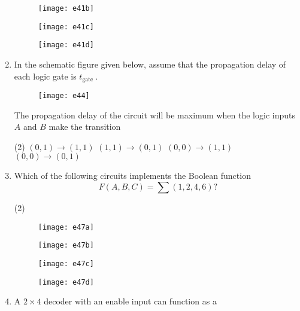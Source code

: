 \begin{enumerate}
\begin{tasks}
\begin{figure}[H]
			\centering
			\texttt{[image: e41b]}
		\end{figure}
		\task[\textbf{C.}] \begin{figure}[H]
			\centering
			\texttt{[image: e41c]}
		\end{figure}
		\task[\textbf{D.}] \begin{figure}[H]
			\centering
			\texttt{[image: e41d]}
		\end{figure}
	\end{tasks}
	\item In the schematic figure given below, assume that the propagation delay of each logic gate is $t_{\text {gate }}$.\\
	\begin{figure}[H]
		\centering
		\texttt{[image: e44]}
	\end{figure}
	The propagation delay of the circuit will be maximum when the logic inputs $A$ and $B$ make the transition
	{}
	\begin{tasks}(2)
		\task[\textbf{A.}] $(0,1) \rightarrow(1,1)$
		\task[\textbf{B.}] $(1,1) \rightarrow(0,1)$
		\task[\textbf{C.}] $(0,0) \rightarrow(1,1)$
		\task[\textbf{D.}] 	$(0,0) \rightarrow(0,1)$
	\end{tasks}
	\item Which of the following circuits implements the Boolean function
	$$F(A, B, C)=\sum(1,2,4,6) ?$$
	{	}
	\begin{tasks}(2)
		\task[\textbf{A.}] \begin{figure}[H]
			\centering
			\texttt{[image: e47a]}
		\end{figure}
		\task[\textbf{B.}] \begin{figure}[H]
			\centering
			\texttt{[image: e47b]}
		\end{figure}
		\task[\textbf{C.}] \begin{figure}[H]
			\centering
			\texttt{[image: e47c]}
		\end{figure}
		\task[\textbf{D.}] \begin{figure}[H]
			\centering
			\texttt{[image: e47d]}
		\end{figure}
	\end{tasks}
	\item A $2 \times 4$ decoder with an enable input can function as a
	{	}

\end{enumerate}

